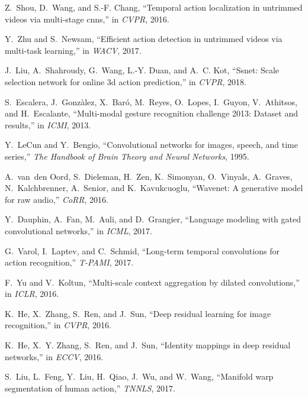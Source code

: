 \documentclass[10pt,twocolumn,letterpaper]{article}
\begin{document}
\begin{thebibliography}{10}
   Z.~Shou, D.~Wang, and S.-F. Chang, ``Temporal action localization in untrimmed
     videos via multi-stage cnns,'' in \emph{CVPR}, 2016.
   
   Y.~Zhu and S.~Newsam, ``Efficient action detection in untrimmed videos via
     multi-task learning,'' in \emph{WACV}, 2017.
   
   J.~Liu, A.~Shahroudy, G.~Wang, L.-Y. Duan, and A.~C. Kot, ``Ssnet: Scale
     selection network for online 3d action prediction,'' in \emph{CVPR}, 2018.
   
   S.~Escalera, J.~Gonz{\`a}lez, X.~Bar{\'o}, M.~Reyes, O.~Lopes, I.~Guyon,
     V.~Athitsos, and H.~Escalante, ``Multi-modal gesture recognition challenge
     2013: Dataset and results,'' in \emph{ICMI}, 2013.
   
   Y.~LeCun and Y.~Bengio, ``Convolutional networks for images, speech, and time
     series,'' \emph{The Handbook of Brain Theory and Neural Networks}, 1995.
   
   A.~van~den Oord, S.~Dieleman, H.~Zen, K.~Simonyan, O.~Vinyals, A.~Graves,
     N.~Kalchbrenner, A.~Senior, and K.~Kavukcuoglu, ``Wavenet: A generative model
     for raw audio,'' \emph{CoRR}, 2016.
   
   Y.~Dauphin, A.~Fan, M.~Auli, and D.~Grangier, ``Language modeling with gated
     convolutional networks,'' in \emph{ICML}, 2017.
   
   G.~Varol, I.~Laptev, and C.~Schmid, ``Long-term temporal convolutions for
     action recognition,'' \emph{T-PAMI}, 2017.
   
   F.~Yu and V.~Koltun, ``Multi-scale context aggregation by dilated
     convolutions,'' in \emph{ICLR}, 2016.
   
   K.~He, X.~Zhang, S.~Ren, and J.~Sun, ``Deep residual learning for image
     recognition,'' in \emph{CVPR}, 2016.
   
   K.~He, X.~Y. Zhang, S.~Ren, and J.~Sun, ``Identity mappings in deep residual
     networks,'' in \emph{ECCV}, 2016.
   
   S.~Liu, L.~Feng, Y.~Liu, H.~Qiao, J.~Wu, and W.~Wang, ``Manifold warp
     segmentation of human action,'' \emph{TNNLS}, 2017.
   

\end{thebibliography}
\end{document}
